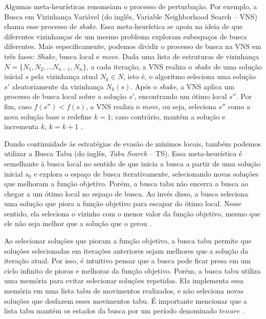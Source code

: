Algumas meta-heurísticas renomeiam o processo de perturbação. Por exemplo, a Busca em Vizinhança Variável (do inglês, Variable Neighborhood Search -- \acs{VNS}) chama esse processo de \textit{shake}. Essa meta-heurística se apoia na ideia de que diferentes vizinhanças de um mesmo problema exploram subespaços de busca diferentes. Mais especificamente, podemos dividir o processo de busca na \ac{VNS} em três fases: \textit{Shake}, busca local e \textit{move}. Dada uma lista de estruturas de vizinhança $N = \{N_1, N_2,...N_{n-1}, N_n\}$, a cada iteração, a \ac{VNS} realiza o \textit{shake} de uma solução inicial $s$ pela vizinhança atual $N_k \in N$, isto é, o algoritmo seleciona uma solução $s'$ aleatoriamente da vizinhança $N_k(s)$. Após o \textit{shake}, a \ac{VNS} aplica um processo de busca local sobre a solução $s'$, encontrando um ótimo local $s''$. Por fim, caso $f(s'') < f(s)$, a \ac{VNS} realiza o \textit{move}, ou seja, seleciona $s''$ como a nova solução base e redefine $k=1$; caso contrário, mantém a solução e incrementa $k$, $k = k+1$ \citep{talbi}.


Dando continuidade às estratégias de evasão de mínimos locais, também podemos utilizar a Busca Tabu (do inglês, \textit{Tabu Search} -- \acs{TS}). Essa meta-heurística é semelhante à busca local no sentido de que inicia a busca a partir de uma solução inicial $s_0$ e explora o espaço de busca iterativamente, selecionando novas soluções que melhoram a função objetivo. Porém, a busca tabu não encerra a busca ao chegar a um ótimo local no espaço de busca. Ao invés disso, a busca seleciona uma solução que piora a função objetivo para escapar do ótimo local. Nesse sentido, ela seleciona o vizinho com o menor valor da função objetivo, mesmo que ele não seja melhor que a solução que o gerou \citep{talbi}.

Ao selecionar soluções que pioram a função objetivo, a busca tabu permite que soluções selecionadas em iterações anteriores sejam melhores que a solução da iteração atual. Por isso, é intuitivo pensar que a busca pode ficar presa em um ciclo infinito de pioras e melhoras da função objetivo. Porém, a busca tabu utiliza uma memória para evitar selecionar soluções repetidas. Ela implementa essa memória em uma lista tabu de movimentos realizados, e não seleciona novas soluções que desfazem esses movimentos tabu. É importante mencionar que a lista tabu mantém os estados da busca por um período denominado $tenure$ \citep{talbi}.

